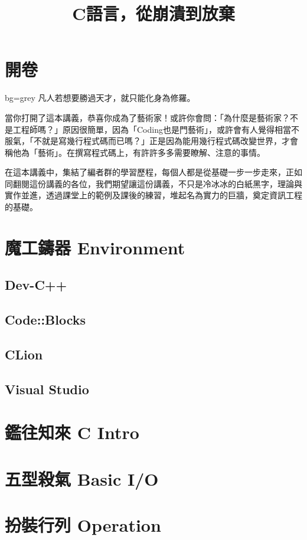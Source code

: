 \documentclass[12pt,a4paper]{book}
\title{C語言，從崩潰到放棄}
\begin{document}
\chapter{開卷}
\begin{block}{bg=grey}
    凡人若想要勝過天才，就只能化身為修羅。
\end{block}

當你打開了這本講義，恭喜你成為了藝術家！或許你會問：「為什麼是藝術家？不是工程師嗎？」原因很簡單，因為「Coding也是門藝術」，或許會有人覺得相當不服氣，「不就是寫幾行程式碼而已嗎？」正是因為能用幾行程式碼改變世界，才會稱他為「藝術」。在撰寫程式碼上，有許許多多需要瞭解、注意的事情。

在這本講義中，集結了編者群的學習歷程，每個人都是從基礎一步一步走來，正如同翻閱這份講義的各位，我們期望讓這份講義，不只是冷冰冰的白紙黑字，理論與實作並進，透過課堂上的範例及課後的練習，堆起名為實力的巨牆，奠定資訊工程的基礎。


\chapter{魔工鑄器 Environment}
\section{Dev-C++}
\section{Code::Blocks}
\section{CLion}
\section{Visual Studio}

\chapter{鑑往知來 C Intro}

\chapter{五型殺氣 Basic I/O}

\chapter{扮裝行列 Operation}
\end{document}

